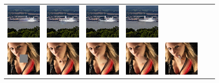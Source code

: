 \begin{figure}[h!]
\begin{tabular}{ccccccc}
\includegraphics[width=.14\textwidth]{figures/imagenet/0165_nps2.jpg}&
\includegraphics[width=.14\textwidth]{figures/imagenet/imagenet_0165_siggraph2017.jpg}&
\includegraphics[width=.14\textwidth]{figures/imagenet/imagenet_0165_g.jpg}&
\includegraphics[width=.14\textwidth]{figures/imagenet/imagenet_0165_synthesized_image.jpg}\\
\includegraphics[width=.14\textwidth]{figures/imagenet/imagenet_0197_input_image.jpg}&
\includegraphics[width=.14\textwidth]{figures/imagenet/imagenet_0197_pm.jpg}&
\includegraphics[width=.14\textwidth]{figures/imagenet/0197_ce2.jpg}&
\includegraphics[width=.14\textwidth]{figures/imagenet/0197_nps2.jpg}&
\includegraphics[width=.14\textwidth]{figures/imagenet/imagenet_0197_siggraph2017.jpg}&

\end{tabular}
\end{figure}
